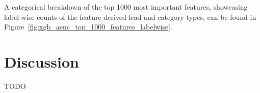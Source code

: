 \documentclass[\main/thesis.tex]{subfiles}
\begin{document}
A categorical breakdown of the top 1000 most important features, showcasing label-wise counts of the feature derived lead and category types, can be found in Figure~\ref{fig:xgb_aenc_top_1000_features_labelwise}.

\section{Discussion}
TODO




\end{document}
